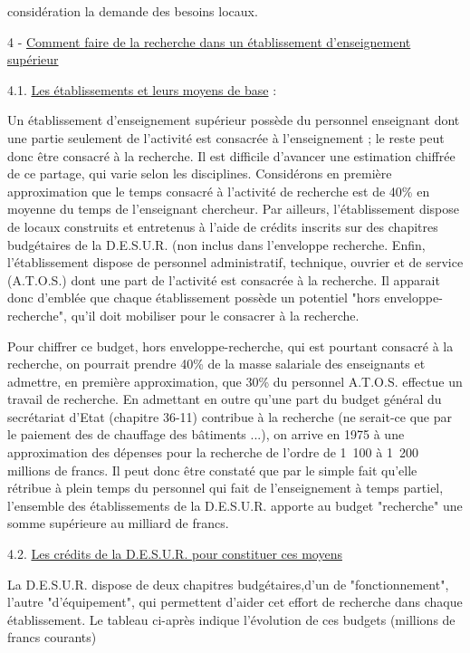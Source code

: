 
\unsure{-} considération la demande des besoins locaux.

4 - \uline{Comment faire de la recherche dans un établissement d'enseignement supérieur}

4.1. \uline{Les établissements et leurs moyens de base} :

Un établissement d'enseignement supérieur possède du personnel enseignant dont une partie seulement de l'activité est consacrée à l'enseignement ; le reste peut donc être consacré à la recherche. Il est difficile d'avancer une estimation chiffrée de ce partage, qui varie selon les disciplines. Considérons en première approximation que le temps consacré à l'activité de recherche est de 40\% en moyenne du temps de l'enseignant chercheur. Par ailleurs, l'établissement dispose de locaux construits et entretenus à l'aide de crédits inscrits sur des chapitres budgétaires de la D.E.S.U.R. (non inclus dans l'enveloppe recherche\handwritten{)}. Enfin, l'établissement dispose de personnel administratif, technique, ouvrier et de service (A.T.O.S.) dont une part de l'activité est consacrée à la recherche. Il apparait donc d'emblée que chaque établissement possède un potentiel "hors enveloppe-recherche", qu'il doit mobiliser pour le consacrer à la recherche.

Pour chiffrer ce budget, hors enveloppe-recherche, qui est pourtant consacré à la recherche, on pourrait prendre 40\% de la masse salariale des enseignants et admettre, en première approximation, que 30\% du personnel A.T.O.S. effectue un travail de recherche. En admettant en outre qu'une part du budget général du secrétariat d'Etat (chapitre 36-11) contribue à la recherche (ne serait-ce que par le paiement des  de chauffage des bâtiments ...), on arrive en 1975 à une approximation des dépenses pour la recherche de l'ordre de 1~100 à 1~200 millions de francs. Il peut donc être constaté que par le simple fait qu'elle rétribue à plein temps du personnel qui fait de l'enseignement à temps partiel, l'ensemble des établissements de la D.E.S.U.R. apporte au budget "recherche" une somme supérieure au milliard de francs.

4.2. \uline{Les crédits de la D.E.S.U.R. pour constituer ces moyens}

La D.E.S.U.R. dispose de deux chapitres budgétaires,d'un de "fonctionnement", l'autre "d'équipement", qui permettent d'aider cet effort de recherche dans chaque établissement. Le tableau ci-après indique l'évolution de ces budgets (millions de francs courants)
